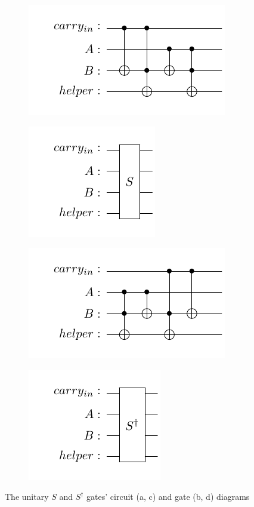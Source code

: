 \begin{figure}[ht]
    \centering
    \begin{subfigure}{0.3\textwidth}
        \includegraphics{images/5_Implementation/quantum_nko_sgate.pdf}
        \caption{}
    \end{subfigure}
    \hspace{2.5cm}
    \begin{subfigure}{0.3\textwidth}
        \includegraphics{images/5_Implementation/quantum_nko_sgate_final.pdf}
        \caption{}
    \end{subfigure}
    \begin{subfigure}{0.3\textwidth}
        \includegraphics{images/5_Implementation/quantum_nko_sdaggate.pdf}
        \caption{}
    \end{subfigure}
    \hspace{2.5cm}
    \begin{subfigure}{0.3\textwidth}
        \includegraphics{images/5_Implementation/quantum_nko_sdaggate_final.pdf}
        \caption{}
    \end{subfigure}
    \caption{The unitary $S$ and $S^\dag$ gates' circuit (a, c) and gate (b, d) diagrams}
\end{figure}

